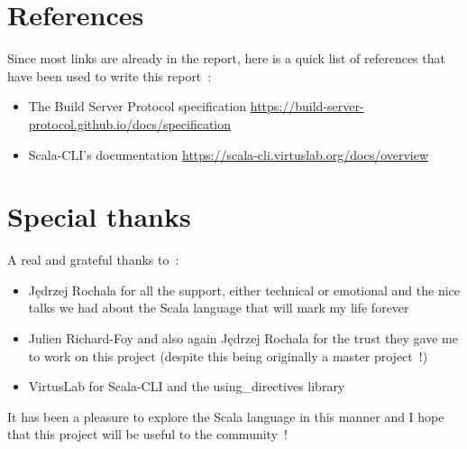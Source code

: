 \documentclass{article}
\begin{document}
\section{References}

Since most links are already in the report, here is a quick list of references that have been used to write this report~:

\begin{itemize}
    \item The Build Server Protocol specification \href{https://build-server-protocol.github.io/docs/specification}{https://build-server-protocol.github.io/docs/specification}
    \item Scala-CLI's documentation \href{https://scala-cli.virtuslab.org/docs/overview}{https://scala-cli.virtuslab.org/docs/overview}
\end{itemize}

\section{Special thanks}

A real and grateful thanks to~:

\begin{itemize}
    \item Jędrzej Rochala for all the support, either technical or emotional and the nice talks we had about the Scala language that will mark my life forever
    \item Julien Richard-Foy and also again Jędrzej Rochala for the trust they gave me to work on this project (despite this being originally a master project~!)
    \item VirtusLab for Scala-CLI and the using\_directives library
\end{itemize}

It has been a pleasure to explore the Scala language in this manner and I hope that this project will be useful to the community~!
\end{document}

